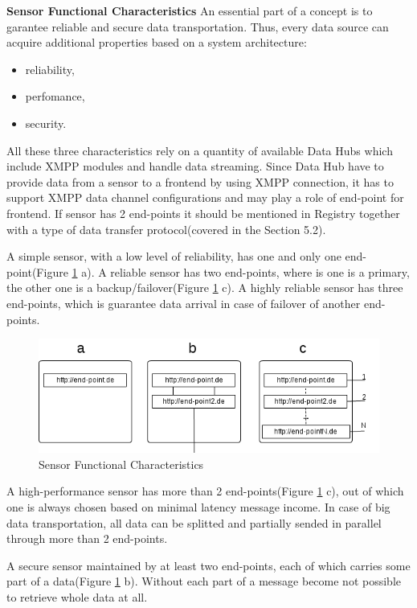   \textbf{Sensor Functional Characteristics}
  \newline
  An essential part of a concept is to garantee reliable and secure data transportation. Thus, every data source can acquire additional properties based on a system architecture:
  \begin{itemize}
  \item reliability,
  \item perfomance,
  \item security.
  \end{itemize}
  All these three characteristics rely on a quantity of available Data Hubs which include XMPP modules and handle data streaming. Since Data Hub have to provide data from a sensor to a frontend by using XMPP connection, it has to support XMPP data channel configurations and may play a role of end-point for frontend. If sensor has 2 end-points it should be mentioned in Registry together with a type of data transfer protocol(covered in the Section 5.2).

  A simple sensor, with a low level of reliability, has one and only one end-point(Figure \ref{img:end_points} a). A reliable sensor has two end-points, where is one is a primary, the other one is a backup/failover(Figure \ref{img:end_points} c). A highly reliable sensor has three end-points, which is guarantee data arrival in case of failover of another end-points. 
     \begin{figure}[!ht]
     \centering
     \includegraphics[scale=0.6]{images/FuncCharacteristics.png}   
     \caption[MVC Pattern]{Sensor Functional Characteristics} 
     \label{img:end_points}                     
     \end{figure}
  A high-performance sensor has more than 2 end-points(Figure \ref{img:end_points} c), out of which one is always chosen based on minimal latency message income. In case of big data transportation, all data can be splitted and partially  sended in parallel through more than 2 end-points. 
    
  A secure sensor maintained by at least two end-points, each of which carries some part of a data(Figure \ref{img:end_points} b). Without each part of a message become not possible to retrieve whole data at all. 

